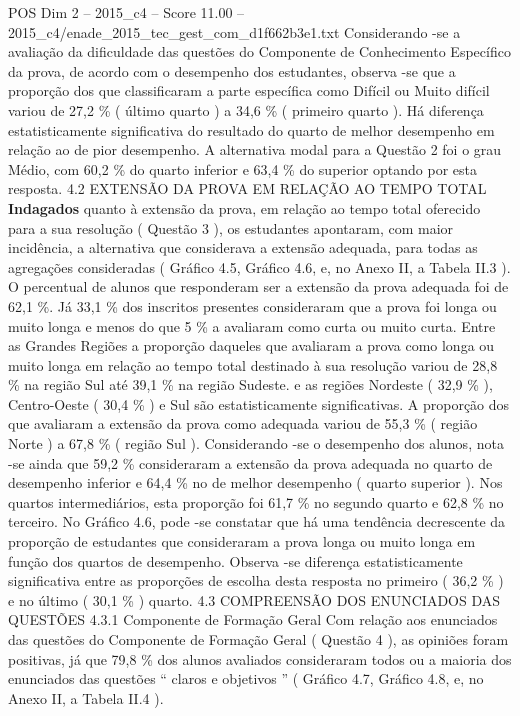 \begin{textsample}{POS Dim 2 – 2015\_c4 – Score 11.00 – 2015\_c4/enade\_2015\_tec\_gest\_com\_d1f662b3e1.txt}
Considerando -se a avaliação da dificuldade das questões do Componente de Conhecimento Específico da prova, de acordo com o desempenho dos estudantes, observa -se que a proporção dos que classificaram a parte específica como Difícil ou Muito difícil variou de 27,2 \% ( último quarto ) a 34,6 \% ( primeiro quarto ).
Há diferença estatisticamente significativa do resultado do quarto de melhor desempenho em relação ao de pior desempenho.
A alternativa modal para a Questão 2 foi o grau Médio, com 60,2 \% do quarto inferior e 63,4 \% do superior optando por esta resposta. 4.2 EXTENSÃO DA PROVA EM RELAÇÃO AO TEMPO TOTAL \textbf{Indagados} quanto à extensão da prova, em relação ao tempo total oferecido para a sua resolução ( Questão 3 ), os estudantes apontaram, com maior incidência, a alternativa que considerava a extensão adequada, para todas as agregações consideradas ( Gráfico 4.5, Gráfico 4.6, e, no Anexo II, a Tabela II.3 ).
O percentual de alunos que responderam ser a extensão da prova adequada foi de 62,1 \%.
Já 33,1 \% dos inscritos presentes consideraram que a prova foi longa ou muito longa e menos do que 5 \% a avaliaram como curta ou muito curta.
Entre as Grandes Regiões a proporção daqueles que avaliaram a prova como longa ou muito longa em relação ao tempo total destinado à sua resolução variou de 28,8 \% na região Sul até 39,1 \% na região Sudeste. e as regiões Nordeste ( 32,9 \% ), Centro-Oeste ( 30,4 \% ) e Sul são estatisticamente significativas.
A proporção dos que avaliaram a extensão da prova como adequada variou de 55,3 \% ( região Norte ) a 67,8 \% ( região Sul ).
Considerando -se o desempenho dos alunos, nota -se ainda que 59,2 \% consideraram a extensão da prova adequada no quarto de desempenho inferior e 64,4 \% no de melhor desempenho ( quarto superior ).
Nos quartos intermediários, esta proporção foi 61,7 \% no segundo quarto e 62,8 \% no terceiro.
No Gráfico 4.6, pode -se constatar que há uma tendência decrescente da proporção de estudantes que consideraram a prova longa ou muito longa em função dos quartos de desempenho.
Observa -se diferença estatisticamente significativa entre as proporções de escolha desta resposta no primeiro ( 36,2 \% ) e no último ( 30,1 \% ) quarto. 4.3 COMPREENSÃO DOS ENUNCIADOS DAS QUESTÕES 4.3.1 Componente de Formação Geral Com relação aos enunciados das questões do Componente de Formação Geral ( Questão 4 ), as opiniões foram positivas, já que 79,8 \% dos alunos avaliados consideraram todos ou a maioria dos enunciados das questões “ claros e objetivos ” ( Gráfico 4.7, Gráfico 4.8, e, no Anexo II, a Tabela II.4 ).

\end{textsample}

